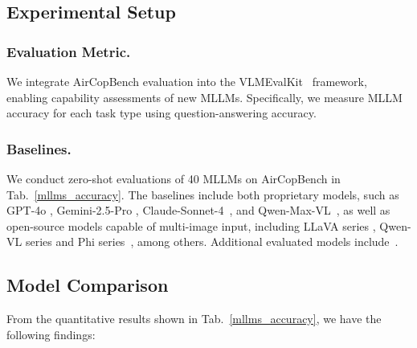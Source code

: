 \documentclass[letterpaper]{article} %
\begin{document}
\subsection{Experimental Setup}
\subsubsection{Evaluation Metric.}
We integrate AirCopBench evaluation into the VLMEvalKit~\cite{duan2024vlmevalkit} framework, enabling capability assessments of new MLLMs. Specifically, we measure MLLM accuracy for each task type using question-answering accuracy.
\subsubsection{Baselines.}
We conduct zero-shot evaluations of 40 MLLMs on AirCopBench in Tab.~\ref{mllms_accuracy}. The baselines include both proprietary models, such as GPT-4o \cite{hurst2024gpt}, Gemini-2.5-Pro \cite{comanici2025gemini}, Claude-Sonnet-4~\cite{Claude3S}, and Qwen-Max-VL~\cite{Qwen-VL}, as well as open-source models capable of multi-image input, including LLaVA series \cite{liu2024llavanext}, Qwen-VL series \cite{bai2025qwen2, wang2024qwen2} and Phi series~\cite{abdin2024phi3, abdin2024phi4}, among others. Additional evaluated models include~\cite{chen2025janus, lu2023chameleon, yao2024minicpm, team2025kimi, Yue2025MiMoVLTR, ye2024mplugowl2, shen2025skywork, lu2024ovis,wang2025ovis, beyer2024paligemma, zhu2025internvl3}.


\subsection{Model Comparison}
From the quantitative results shown in Tab.~\ref{mllms_accuracy}, we have the following findings:
\end{document}
